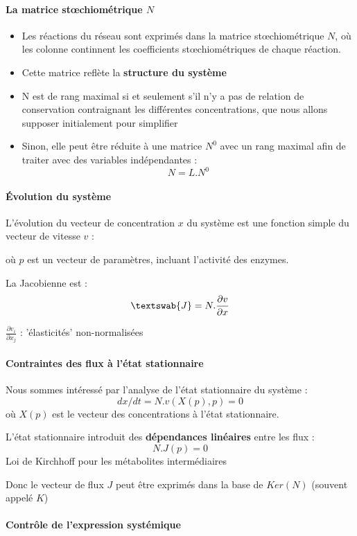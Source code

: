 \paragraph{La matrice stœchiométrique $N$}
\begin{itemize}
	\item Les réactions du réseau sont exprimés dans la matrice stœchiométrique $N$, où les colonne continnent les coefficients stœchiométriques de chaque réaction.
	\item Cette matrice reflète la \textbf{structure du système}
	\item N est de rang maximal si et seulement s'il n'y a pas de relation de conservation contraignant les différentes concentrations, que nous allons supposer initialement pour simplifier
	\item Sinon, elle peut être réduite à une matrice $N^0$ avec un rang maximal afin de traiter avec des variables indépendantes : $$ N=L.N^0 $$
\end{itemize}


\paragraph{Évolution du système}
L'évolution du vecteur de concentration $x$ du système est une fonction simple du vecteur de vitesse $v$ :

 où $p$ est un vecteur de paramètres, incluant l'activité des enzymes.

La Jacobienne est :	$$ \textswab{J}  = N. \frac{ \partial v}{\partial x}     $$

$\frac{\partial v_i}{\partial x_j} $ : 'élasticités' non-normalisées


\paragraph{Contraintes des flux à l'état stationnaire}
Nous sommes intéressé par l'analyse de l'état stationnaire du système :
		$$ dx/dt = N . v(X(p),p) = 0 $$
où $X(p)$ est le vecteur des concentrations à l'état stationnaire.

L'état stationnaire introduit des \textbf{dépendances linéaires} entre les flux : 
$$ N. J(p) = 0 $$
Loi de Kirchhoff pour les métabolites intermédiaires 

Donc le vecteur de flux $J$ peut être exprimés dans la base de $Ker(N)$ (souvent appelé $K$) 


\paragraph{Contrôle de l'expression systémique}

